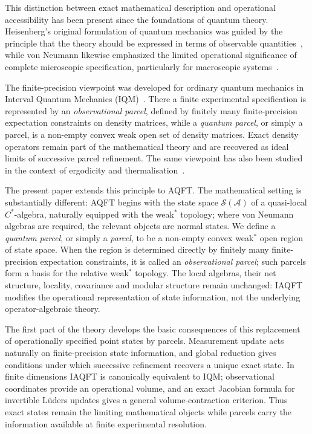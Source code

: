 \documentclass[11pt]{article}
\begin{document}
This distinction between exact mathematical description and operational
accessibility has been present since the foundations of quantum theory.
Heisenberg's original formulation of quantum mechanics was guided by the
principle that the theory should be expressed in terms of observable
quantities~\cite{Heisenberg1925}, while von Neumann likewise emphasized
the limited operational significance of complete microscopic
specification, particularly for macroscopic systems~\cite{vonNeumann1955}.

The finite-precision viewpoint was developed for ordinary quantum
mechanics in Interval Quantum Mechanics (IQM)~\cite{Edalat2026}. There a
finite experimental specification is represented by an
\emph{observational parcel}, defined by finitely many finite-precision
expectation constraints on density matrices, while a \emph{quantum
parcel}, or simply a parcel, is a non-empty convex weak open set of
density matrices. Exact density operators remain part of the mathematical
theory and are recovered as ideal limits of successive parcel refinement.
The same viewpoint has also been studied in the context of ergodicity and
thermalisation~\cite{EdalatErgodicity2026}.

The present paper extends this principle to AQFT. The mathematical
setting is substantially different: AQFT begins with the state space
$\mathcal S(\mathcal A)$ of a quasi-local $C^*$-algebra, naturally
equipped with the weak$^*$ topology; where von Neumann algebras are
required, the relevant objects are normal states. We define a
\emph{quantum parcel}, or simply a \emph{parcel}, to be a non-empty
convex weak$^*$ open region of state space. When the region is determined
directly by finitely many finite-precision expectation constraints, it is
called an \emph{observational parcel}; such parcels form a basis for the
relative weak$^*$ topology. The local algebras, their net structure,
locality, covariance and modular structure remain unchanged: IAQFT
modifies the operational representation of state information, not the
underlying operator-algebraic theory.

The first part of the theory develops the basic consequences of this
replacement of operationally specified point states by parcels.
Measurement update acts naturally on finite-precision state information,
and global reduction gives conditions under which successive refinement
recovers a unique exact state. In finite dimensions IAQFT is canonically
equivalent to IQM; observational coordinates provide an operational
volume, and an exact Jacobian formula for invertible L\"uders updates
gives a general volume-contraction criterion. Thus exact states remain
the limiting mathematical objects while parcels carry the information
available at finite experimental resolution.
\end{document}
